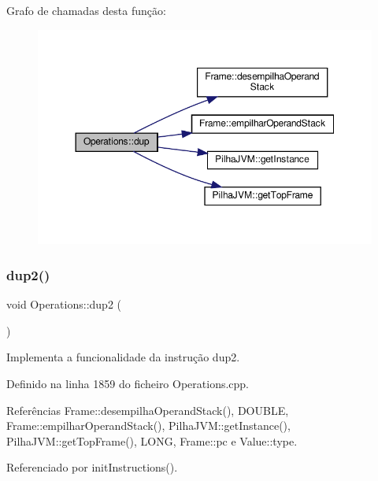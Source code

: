 Grafo de chamadas desta função\+:
\nopagebreak
\begin{figure}[H]
\begin{center}
\leavevmode
\includegraphics[width=350pt]{classOperations_a0cba4ff895f2e3908eea5b39305481a4_cgraph}
\end{center}
\end{figure}
\mbox{\label{classOperations_a7cb6985281b1ab32e905e4726ef2c964}} 
\subsubsection{\texorpdfstring{dup2()}{dup2()}}
{\footnotesize\ttfamily void Operations\+::dup2 (\begin{DoxyParamCaption}{ }\end{DoxyParamCaption})\hspace{0.3cm}{\ttfamily [private]}}



Implementa a funcionalidade da instrução dup2. 



Definido na linha 1859 do ficheiro Operations.\+cpp.



Referências Frame\+::desempilha\+Operand\+Stack(), D\+O\+U\+B\+LE, Frame\+::empilhar\+Operand\+Stack(), Pilha\+J\+V\+M\+::get\+Instance(), Pilha\+J\+V\+M\+::get\+Top\+Frame(), L\+O\+NG, Frame\+::pc e Value\+::type.



Referenciado por init\+Instructions().

